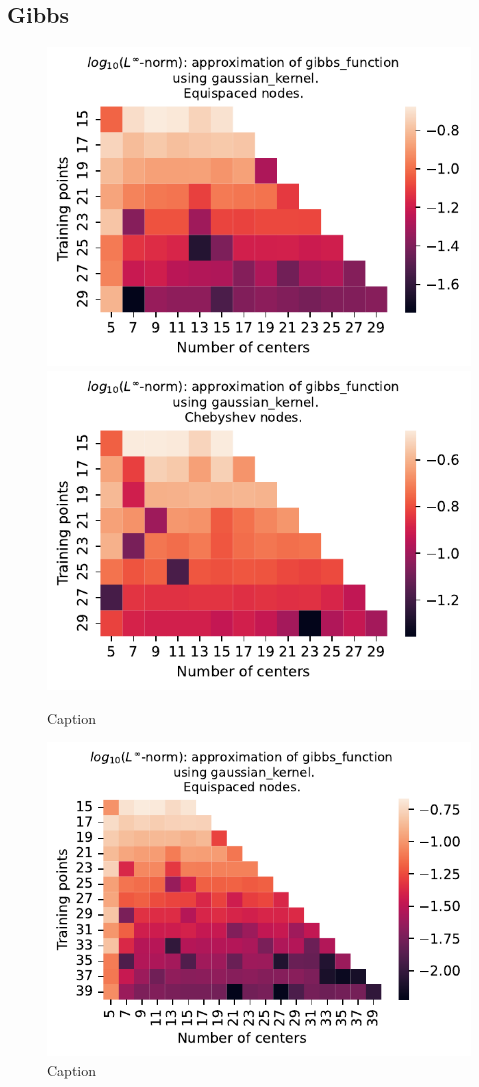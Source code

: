\documentclass[12pt]{report} %
\begin{document}
\subsection*{Gibbs}

\begin{figure}[ht]
  \centering

  \includegraphics[width=.49\textwidth]{imagenes/experiments/1d/variational/gibbs_function-Kgaussian_kernel-Equi.pdf}
  \includegraphics[width=.49\textwidth]{imagenes/experiments/1d/variational/gibbs_function-Kgaussian_kernel-Cheb.pdf}
  \caption{Caption}
  \label{fig:gibbs-gaussian}
\end{figure}

\begin{figure}[ht]
  \centering

  \includegraphics[width=.6\textwidth]{imagenes/experiments/1d/variational/gibbs_gaussian_extended.pdf}
  \caption{Caption}
  \label{fig:gibbs-gaussian-extended}
\end{figure}
\end{document}
